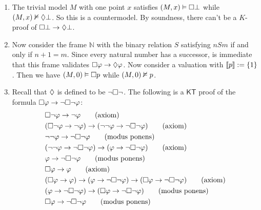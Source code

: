 \documentclass{article}
\begin{document}
\maketitle

\begin{ex}
\begin{enumerate}
\item The trivial model $M$ with one point $x$ satisfies $(M,x)\vDash\square\bot$
while $(M,x)\nvDash\lozenge\bot$. So this is a countermodel. By soundness, there
can't be a $K$-proof of $\square\bot\to\lozenge\bot$. 
\item Now consider the frame $\mathbb{N}$ with the binary relation $S$ satisfying
$n S m$ if and only if $n+1=m$. Since every natural number has a successor, 
is immediate that this frame validates $\square\varphi\to\lozenge\varphi$. Now consider 
a valuation with $\llbracket p\rrbracket:=\{1\}$. Then we have $(M,0)\vDash\square p$ while
$(M,0)\nvDash p$. 
\item Recall that $\lozenge$ is defined to be $\neg\square\neg$. The following is a 
$\mathsf{KT}$ proof of the formula $\square\varphi\to\neg\square\neg\varphi$:
\begin{align*}
& \square\neg\varphi\to\neg\varphi
  \tag{axiom}
  \\
& (\square\neg\varphi\to\neg\varphi)\to(\neg\neg\varphi\to\neg\square\neg\varphi)
  \tag{axiom}
  \\
& \neg\neg\varphi\to\neg\square\neg\varphi
  \tag{modus ponens}
  \\
& (\neg\neg\varphi\to\neg\square\neg\varphi)\to(\varphi\to\neg\square\neg\varphi)
  \tag{axiom}
  \\
& \varphi\to\neg\square\neg\varphi
  \tag{modus ponens}
  \\
& \square\varphi\to\varphi
  \tag{axiom}
  \\
& (\square\varphi\to\varphi)\to(\varphi\to\neg\square\neg\varphi)\to(\square\varphi\to\neg\square\neg\varphi)
  \tag{axiom}
  \\
& (\varphi\to\neg\square\neg\varphi)\to(\square\varphi\to\neg\square\neg\varphi)
  \tag{modus ponens}
  \\
& \square\varphi\to\neg\square\neg\varphi
  \tag{modus ponens}
\end{align*}
\end{enumerate}
\end{ex}
\end{document}
